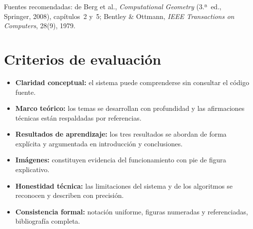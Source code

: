 \documentclass[11pt]{article}
\begin{document}
Fuentes recomendadas: de Berg et al., \textit{Computational Geometry}
(3.ª~ed., Springer, 2008), capítulos~2 y~5; Bentley \& Ottmann, \textit{IEEE
Transactions on Computers}, 28(9), 1979.


\section*{Criterios de evaluación}

\begin{itemize}
  \item \textbf{Claridad conceptual:} el sistema puede comprenderse sin consultar
        el código fuente.
  \item \textbf{Marco teórico:} los temas se desarrollan con profundidad y las
        afirmaciones técnicas están respaldadas por referencias.
  \item \textbf{Resultados de aprendizaje:} los tres resultados se abordan de
        forma explícita y argumentada en introducción y conclusiones.
  \item \textbf{Imágenes:} constituyen evidencia del funcionamiento con pie de
        figura explicativo.
  \item \textbf{Honestidad técnica:} las limitaciones del sistema y de los
        algoritmos se reconocen y describen con precisión.
  \item \textbf{Consistencia formal:} notación uniforme, figuras numeradas y
        referenciadas, bibliografía completa.
\end{itemize}
\end{document}
